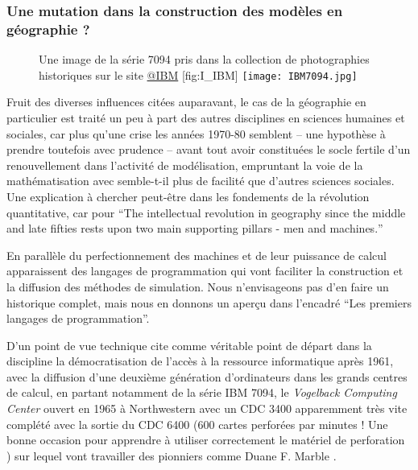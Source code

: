 \subsubsection{Une mutation dans la construction des modèles en géographie ?}
\label{ssec:crise_mutation}

\begin{figure}[htbp]
\begin{sidecaption}[fortoc]{Une image de la série 7094 pris dans la collection de photographies historiques sur le site \href{http://www-03.ibm.com/ibm/history/exhibits/mainframe/mainframe_album.html}{@IBM} }[fig:I_IBM]
  \centering
 \texttt{[image: IBM7094.jpg]}
  \end{sidecaption}
\end{figure}

Fruit des diverses influences citées auparavant, le cas de la géographie en particulier est traité un peu à part des autres disciplines en sciences humaines et sociales, car plus qu'une crise les années 1970-80 semblent -- une hypothèse à prendre toutefois avec prudence -- avant tout avoir constituées le socle fertile d'un renouvellement dans l'activité de modélisation, empruntant la voie de la mathématisation avec semble-t-il plus de facilité que d'autres sciences sociales. Une explication à chercher peut-être dans les fondements de la révolution quantitative, car pour \textcite{Gould1970} \foreignquote{english}{The intellectual revolution in geography since the middle and late fifties rests upon two main supporting pillars - men and machines.}

En parallèle du perfectionnement des machines et de leur puissance de calcul apparaissent des langages de programmation qui vont faciliter la construction et la diffusion des méthodes de simulation. Nous n'envisageons pas d'en faire un historique complet, mais nous en donnons un aperçu dans l'encadré \enquote{Les premiers langages de programmation}.

D'un point de vue technique \textcite{Haggett1969} cite comme véritable point de départ dans la discipline la démocratisation de l'accès à la ressource informatique après 1961, avec la diffusion d'une deuxième génération d'ordinateurs dans les grands centres de calcul, en partant notamment de la série IBM 7094, le \textit{Vogelback Computing Center}  ouvert en 1965 à Northwestern avec un CDC 3400 apparemment très vite complété avec la sortie du CDC 6400 (600 cartes perforées par minutes ! Une bonne occasion pour apprendre à utiliser correctement le matériel de perforation \autocite{Fisk2005}) sur lequel vont travailler des pionniers comme Duane F. Marble .

